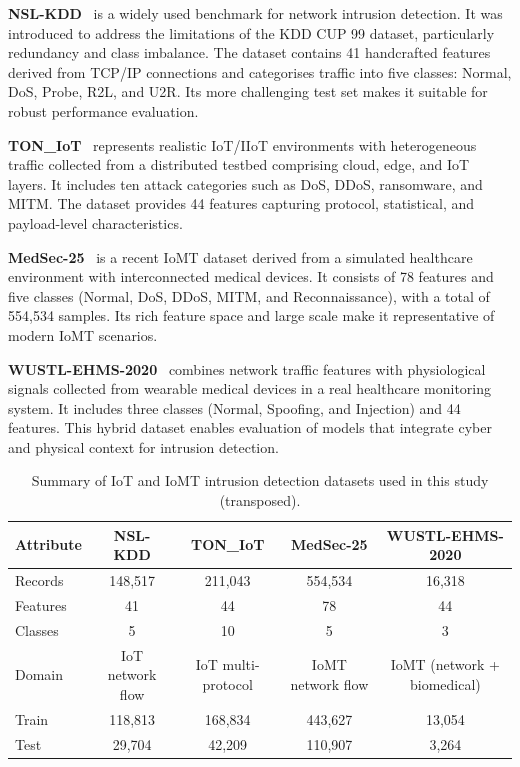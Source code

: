\documentclass[journal,twoside,web]{ieeecolor}
\begin{document}
\textbf{NSL-KDD}~\cite{tavallaee2009nslkdd} is a widely used benchmark
for network intrusion detection. It was introduced to address the
limitations of the KDD CUP 99 dataset, particularly redundancy and
class imbalance. The dataset contains 41 handcrafted features derived
from TCP/IP connections and categorises traffic into five classes:
Normal, DoS, Probe, R2L, and U2R. Its more challenging test set makes it
suitable for robust performance evaluation.

\textbf{TON\_IoT}~\cite{moustafa2021ton} represents realistic IoT/IIoT
environments with heterogeneous traffic collected from a distributed
testbed comprising cloud, edge, and IoT layers. It includes ten attack
categories such as DoS, DDoS, ransomware, and MITM. The dataset provides
44 features capturing protocol, statistical, and payload-level
characteristics.

\textbf{MedSec-25}~\cite{medsec25} is a recent IoMT dataset derived from
a simulated healthcare environment with interconnected medical devices.
It consists of 78 features and five classes (Normal, DoS, DDoS, MITM,
and Reconnaissance), with a total of 554,534 samples. Its rich feature
space and large scale make it representative of modern IoMT scenarios.

\textbf{WUSTL-EHMS-2020}~\cite{hady2020wustl} combines network traffic
features with physiological signals collected from wearable medical
devices in a real healthcare monitoring system. It includes three
classes (Normal, Spoofing, and Injection) and 44 features. This hybrid
dataset enables evaluation of models that integrate cyber and physical
context for intrusion detection.

\begin{table}[t]
\caption{Summary of IoT and IoMT intrusion detection datasets used in this study (transposed).}
\label{tab:datasets_transposed}
\centering
\renewcommand{\arraystretch}{1.2}
\small
\begin{tabular}{|l|c|c|c|c|}
\hline
\textbf{Attribute} & \textbf{NSL-KDD} & \textbf{TON\_IoT} & \textbf{MedSec-25} & \textbf{WUSTL-EHMS-2020} \\
\hline
Records   & 148,517 & 211,043 & 554,534 & 16,318 \\
\hline
Features  & 41      & 44      & 78      & 44 \\
\hline
Classes   & 5       & 10      & 5       & 3 \\
\hline
Domain    & IoT network flow & IoT multi-protocol & IoMT network flow & IoMT (network + biomedical) \\
\hline
Train     & 118,813 & 168,834 & 443,627 & 13,054 \\
\hline
Test      & 29,704  & 42,209  & 110,907 & 3,264 \\
\hline
\end{tabular}
\end{table}
\end{document}
